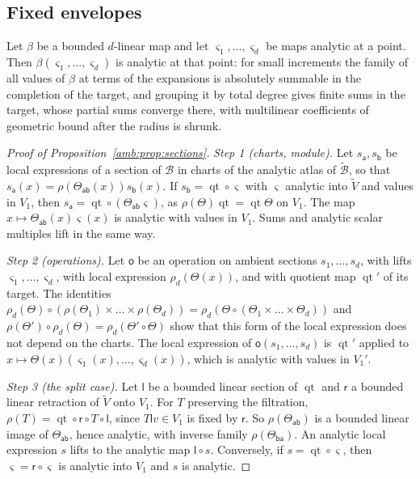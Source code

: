 \subsection{Fixed envelopes}\label{amb:ssec:proofs-fixed}

Let $\beta$ be a bounded $d$\nobreakdash-linear map and let $\varsigma_1,\dots,\varsigma_d$ be maps analytic at a point. Then $\beta(\varsigma_1,\dots,\varsigma_d)$ is analytic at that point: for small increments the family of all values of $\beta$ at terms of the expansions is absolutely summable in the completion of the target, and grouping it by total degree gives finite sums in the target, whose partial sums converge there, with multilinear coefficients of geometric bound after the radius is shrunk.

\begin{proof}[Proof of Proposition~\ref{amb:prop:sections}]
\emph{Step 1 (charts, module).} Let $s_{\mathsf a},s_{\mathsf b}$ be local expressions of a section of $\mathcal B$ in charts of the analytic atlas of $\widetilde{\mathcal B}$, so that $s_{\mathsf a}(x)=\rho(\Theta_{\mathsf{ab}}(x))s_{\mathsf b}(x)$. If $s_{\mathsf b}=\operatorname{qt}\circ\varsigma$ with $\varsigma$ analytic into $\tilde V$ and values in $V_1$, then $s_{\mathsf a}=\operatorname{qt}\circ(\Theta_{\mathsf{ab}}\varsigma)$, as $\rho(\Theta)\operatorname{qt}=\operatorname{qt}\Theta$ on $V_1$. The map $x\mapsto\Theta_{\mathsf{ab}}(x)\varsigma(x)$ is analytic with values in $V_1$. Sums and analytic scalar multiples lift in the same way.

\emph{Step 2 (operations).} Let $\mathsf o$ be an operation on ambient sections $s_1,\dots,s_d$, with lifts $\varsigma_1,\dots,\varsigma_d$, with local expression $\rho_d(\Theta(x))$, and with quotient map $\operatorname{qt}'$ of its target. The identities $\rho_d(\Theta)\circ(\rho(\Theta_1)\times\dots\times\rho(\Theta_d))=\rho_d(\Theta\circ(\Theta_1\times\dots\times\Theta_d))$ and $\rho(\Theta')\circ\rho_d(\Theta)=\rho_d(\Theta'\circ\Theta)$ show that this form of the local expression does not depend on the charts. The local expression of $\mathsf o(s_1,\dots,s_d)$ is $\operatorname{qt}'$ applied to $x\mapsto\Theta(x)(\varsigma_1(x),\dots,\varsigma_d(x))$, which is analytic with values in $V_1'$.

\emph{Step 3 (the split case).} Let $\mathsf l$ be a bounded linear section of $\operatorname{qt}$ and $\mathsf r$ a bounded linear retraction of $\tilde V$ onto $V_1$. For $T$ preserving the filtration, $\rho(T)=\operatorname{qt}\circ\mathsf r\circ T\circ\mathsf l$, since $T\mathsf lv\in V_1$ is fixed by $\mathsf r$. So $\rho(\Theta_{\mathsf{ab}})$ is a bounded linear image of $\Theta_{\mathsf{ab}}$, hence analytic, with inverse family $\rho(\Theta_{\mathsf{ba}})$. An analytic local expression $s$ lifts to the analytic map $\mathsf l\circ s$. Conversely, if $s=\operatorname{qt}\circ\varsigma$, then $\varsigma=\mathsf r\circ\varsigma$ is analytic into $V_1$ and $s$ is analytic.
\end{proof}

